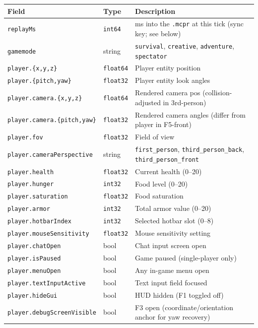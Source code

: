 \documentclass[11pt,a4paper]{article}
\begin{document}
\begin{center}
\begin{tabular}{lll}
\toprule
Field & Type & Description \\
\midrule
\texttt{replayMs} & \texttt{int64} & ms into the \texttt{.mcpr} at this tick (sync key; see below) \\
\texttt{gamemode} & string & \texttt{survival}, \texttt{creative}, \texttt{adventure}, \texttt{spectator} \\
\texttt{player.\{x,y,z\}} & \texttt{float64} & Player entity position \\
\texttt{player.\{pitch,yaw\}} & \texttt{float32} & Player entity look angles \\
\texttt{player.camera.\{x,y,z\}} & \texttt{float64} & Rendered camera pos (collision-adjusted in 3rd-person) \\
\texttt{player.camera.\{pitch,yaw\}} & \texttt{float32} & Rendered camera angles (differ from player in F5-front) \\
\texttt{player.fov} & \texttt{float32} & Field of view \\
\texttt{player.cameraPerspective} & string & \texttt{first\_person}, \texttt{third\_person\_back}, \texttt{third\_person\_front} \\
\texttt{player.health} & \texttt{float32} & Current health (0--20) \\
\texttt{player.hunger} & \texttt{int32} & Food level (0--20) \\
\texttt{player.saturation} & \texttt{float32} & Food saturation \\
\texttt{player.armor} & \texttt{int32} & Total armor value (0--20) \\
\texttt{player.hotbarIndex} & \texttt{int32} & Selected hotbar slot (0--8) \\
\texttt{player.mouseSensitivity} & \texttt{float32} & Mouse sensitivity setting \\
\texttt{player.chatOpen} & bool & Chat input screen open \\
\texttt{player.isPaused} & bool & Game paused (single-player only) \\
\texttt{player.menuOpen} & bool & Any in-game menu open \\
\texttt{player.textInputActive} & bool & Text input field focused \\
\texttt{player.hideGui} & bool & HUD hidden (F1 toggled off) \\
\texttt{player.debugScreenVisible} & bool & F3 open (coordinate/orientation anchor for yaw recovery) \\

\end{tabular}
\end{center}
\end{document}
